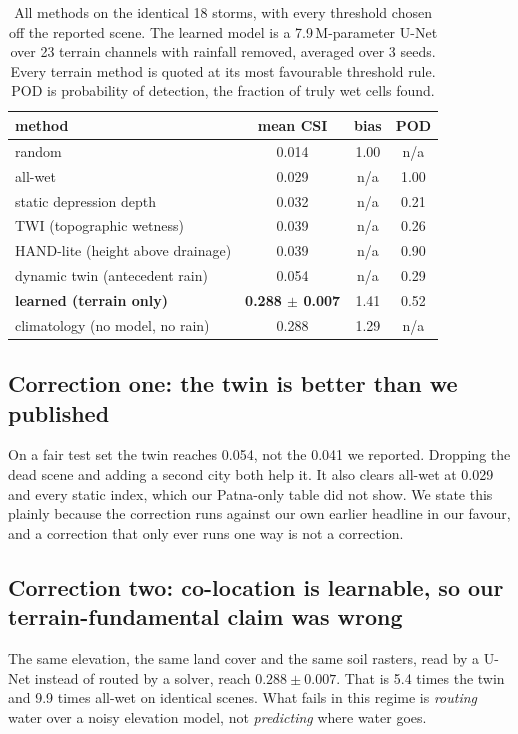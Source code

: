 \begin{table}[!t]
\centering
\caption{All methods on the identical 18 storms, with every threshold chosen off the reported
scene. The learned model is a 7.9\,M-parameter U-Net over 23 terrain channels with rainfall
removed, averaged over 3 seeds. Every terrain method is quoted at its most favourable threshold
rule. POD is probability of detection, the fraction of truly wet cells found.}
\label{tab:baselines}
\begin{tabular}{lccc}
\toprule
method & mean CSI & bias & POD \\
\midrule
random                            & 0.014 & 1.00 & n/a \\
all-wet                           & 0.029 & n/a  & 1.00 \\
static depression depth           & 0.032 & n/a  & 0.21 \\
TWI (topographic wetness)         & 0.039 & n/a  & 0.26 \\
HAND-lite (height above drainage) & 0.039 & n/a  & 0.90 \\
dynamic twin (antecedent rain)    & 0.054 & n/a  & 0.29 \\
\midrule
\textbf{learned (terrain only)}   & \textbf{0.288 $\pm$ 0.007} & 1.41 & 0.52 \\
climatology (no model, no rain)   & 0.288 & 1.29 & n/a \\
\bottomrule
\end{tabular}
\end{table}

\subsection{Correction one: the twin is better than we published}
On a fair test set the twin reaches 0.054, not the 0.041 we reported. Dropping the dead scene and
adding a second city both help it. It also clears all-wet at 0.029 and every static index, which
our Patna-only table did not show. We state this plainly because the correction runs against our
own earlier headline in our favour, and a correction that only ever runs one way is not a
correction.

\subsection{Correction two: co-location is learnable, so our terrain-fundamental claim was wrong}
The same elevation, the same land cover and the same soil rasters, read by a U-Net instead of routed
by a solver, reach $0.288 \pm 0.007$. That is 5.4 times the twin and 9.9 times all-wet on identical
scenes. What fails in this regime is \emph{routing} water over a noisy elevation model, not
\emph{predicting} where water goes.

